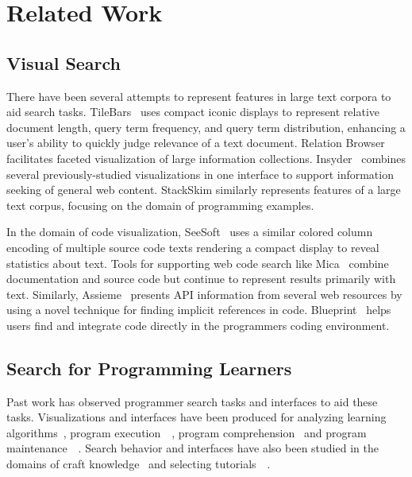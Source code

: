 \section{Related Work}

\subsection{Visual Search}

There have been several attempts to represent features in large text corpora to aid search tasks.
TileBars~\cite{hearst_tilebars:_1995} uses compact iconic displays to represent relative document length, query term frequency, and query term distribution, enhancing a user's ability to quickly judge relevance of a text document. 
Relation Browser~\cite{zhang_evaluation_2005} facilitates faceted visualization of large information collections. 
Insyder~\cite{reiterer_insyder_2000} combines several previously-studied visualizations in one interface to support information seeking of general web content.
StackSkim similarly represents features of a large text corpus, focusing on the domain of programming examples.

In the domain of code visualization, SeeSoft~\cite{eick_graphically_1994-1} uses a similar colored column encoding of multiple source code texts rendering a compact display to reveal statistics about text. 
Tools for supporting web code search like Mica~\cite{stylos_mica:_2006} combine documentation and source code but continue to represent results primarily with text. 
Similarly, Assieme~\cite{hoffmann_assieme:_2007} presents API information from several web resources by using a novel technique for finding implicit references in code. 
Blueprint~\cite{brandt_example-centric_2010} helps users find and integrate code directly in the programmers coding environment.

\subsection{Search for Programming Learners}

Past work has observed programmer search tasks and interfaces to aid these tasks. 
Visualizations and interfaces have been produced for analyzing learning algorithms~\cite{hundhausen_meta-study_2002}, program execution~\cite{de_pauw_zinsight:_2010}~\cite{aftandilian_heapviz:_2010}, program comprehension~\cite{islam_dependence_2010} and program maintenance~\cite{bragdon_code_2010}~\cite{coblenz_jasper:_2006}. 
Search behavior and interfaces have also been studied in the domains of craft knowledge~\cite{torrey_learning_2009} and selecting tutorials~\cite{Pavel:EECS-2013-167}~\cite{kong_delta:_2012}.

